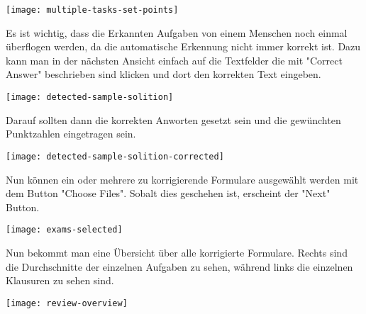\texttt{[image: multiple-tasks-set-points]}

Es ist wichtig, dass die Erkannten Aufgaben von einem Menschen noch einmal \"uberflogen werden, da die automatische Erkennung nicht immer korrekt ist.
Dazu kann man in der n\"achsten Ansicht einfach auf die Textfelder die mit "Correct Answer" beschrieben sind klicken und dort den korrekten Text eingeben.

\texttt{[image: detected-sample-solition]}

Darauf sollten dann die korrekten Anworten gesetzt sein und die gew\"unchten Punktzahlen eingetragen sein.

\texttt{[image: detected-sample-solition-corrected]}

Nun k\"onnen ein oder mehrere zu korrigierende Formulare ausgew\"ahlt werden mit dem Button "Choose Files".
Sobalt dies geschehen ist, erscheint der "Next" Button.

\texttt{[image: exams-selected]}

Nun bekommt man eine \"Ubersicht \"uber alle korrigierte Formulare.
Rechts sind die Durchschnitte der einzelnen Aufgaben zu sehen, w\"ahrend links die einzelnen Klausuren zu sehen sind.

\texttt{[image: review-overview]}
